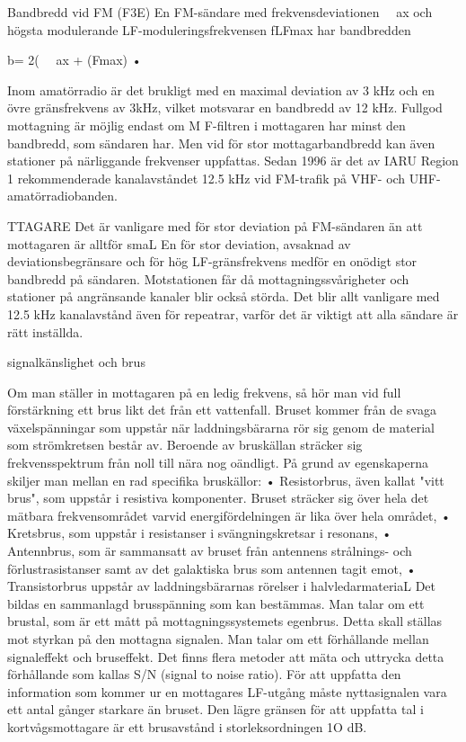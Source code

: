 Bandbredd vid FM (F3E)
En FM-sändare med frekvensdeviationen
~~ax och högsta modulerande LF-moduleringsfrekvensen fLFmax har bandbredden

b= 2( ~~ax + (Fmax) •

Inom amatörradio är det brukligt med en
maximal deviation av 3 kHz och en övre
gränsfrekvens av 3kHz, vilket motsvarar en
bandbredd av 12 kHz.
Fullgod mottagning är möjlig endast om
M F-filtren i mottagaren har minst den bandbredd, som sändaren har. Men vid för stor
mottagarbandbredd kan även stationer på
närliggande frekvenser uppfattas. Sedan
1996 är det av IARU Region 1 rekommenderade kanalavståndet 12.5 kHz vid FM-trafik
på VHF- och UHF-amatörradiobanden.

TTAGARE
Det är vanligare med för stor deviation på
FM-sändaren än att mottagaren är alltför
smaL En för stor deviation, avsaknad av
deviationsbegränsare och för hög LF-gränsfrekvens medför en onödigt stor bandbredd
på sändaren. Motstationen får då mottagningssvårigheter och stationer på angränsande kanaler blir också störda.
Det blir allt vanligare med 12.5 kHz kanalavstånd även för repeatrar, varför det är
viktigt att alla sändare är rätt inställda.

signalkänslighet och brus

Om man ställer in mottagaren på en ledig
frekvens, så hör man vid full förstärkning ett
brus likt det från ett vattenfall.
Bruset kommer från de svaga växelspänningar som uppstår när laddningsbärarna
rör sig genom de material som strömkretsen
består av. Beroende av bruskällan sträcker
sig frekvensspektrum från noll till nära nog
oändligt. På grund av egenskaperna skiljer
man mellan en rad specifika bruskällor:
• Resistorbrus, även kallat "vitt brus", som
uppstår i resistiva komponenter. Bruset
sträcker sig över hela det mätbara frekvensområdet varvid energifördelningen
är lika över hela området,
• Kretsbrus, som uppstår i resistanser i
svängningskretsar i resonans,
• Antennbrus, som är sammansatt av
bruset från antennens strålnings- och
förlustrasistanser samt av det galaktiska
brus som antennen tagit emot,
• Transistorbrus uppstår av laddningsbärarnas rörelser i halvledarmateriaL
Det bildas en sammanlagd brusspänning
som kan bestämmas. Man talar om ett brustal, som är ett mått på mottagningssystemets
egenbrus. Detta skall ställas mot styrkan på
den mottagna signalen. Man talar om ett
förhållande mellan signaleffekt och bruseffekt. Det finns flera metoder att mäta och
uttrycka detta förhållande som kallas S/N
(signal to noise ratio). För att uppfatta den
information som kommer ur en mottagares
LF-utgång måste nyttasignalen vara ett antal gånger starkare än bruset. Den lägre
gränsen för att uppfatta tal i kortvågsmottagare är ett brusavstånd i storleksordningen 1O dB.

